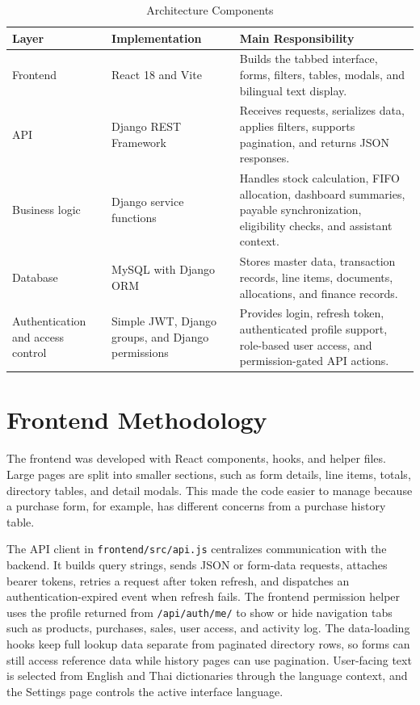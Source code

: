 \begin{table}[H]
	\centering
	\BlackbookTableSetup
	\caption{Architecture Components}
	\label{tab:architecture-components}
	\begin{tabularx}{\textwidth}{|B{2.8cm}|B{3cm}|Z|}
		\hline
		\textbf{Layer} & \textbf{Implementation} & \textbf{Main Responsibility} \\ \hline
		Frontend & React 18 and Vite & Builds the tabbed interface, forms, filters, tables, modals, and bilingual text display. \\ \hline
		API & Django REST Framework & Receives requests, serializes data, applies filters, supports pagination, and returns JSON responses. \\ \hline
		Business logic & Django service functions & Handles stock calculation, FIFO allocation, dashboard summaries, payable synchronization, eligibility checks, and assistant context. \\ \hline
		Database & MySQL with Django ORM & Stores master data, transaction records, line items, documents, allocations, and finance records. \\ \hline
		Authentication and access control & Simple JWT, Django groups, and Django permissions & Provides login, refresh token, authenticated profile support, role-based user access, and permission-gated API actions. \\ \hline
	\end{tabularx}
\end{table}

\section{Frontend Methodology}
The frontend was developed with React components, hooks, and helper files. Large pages are split into smaller sections, such as form details, line items, totals, directory tables, and detail modals. This made the code easier to manage because a purchase form, for example, has different concerns from a purchase history table.

The API client in \texttt{frontend/src/api.js} centralizes communication with the backend. It builds query strings, sends JSON or form-data requests, attaches bearer tokens, retries a request after token refresh, and dispatches an authentication-expired event when refresh fails. The frontend permission helper uses the profile returned from \texttt{/api/auth/me/} to show or hide navigation tabs such as products, purchases, sales, user access, and activity log. The data-loading hooks keep full lookup data separate from paginated directory rows, so forms can still access reference data while history pages can use pagination. User-facing text is selected from English and Thai dictionaries through the language context, and the Settings page controls the active interface language.

